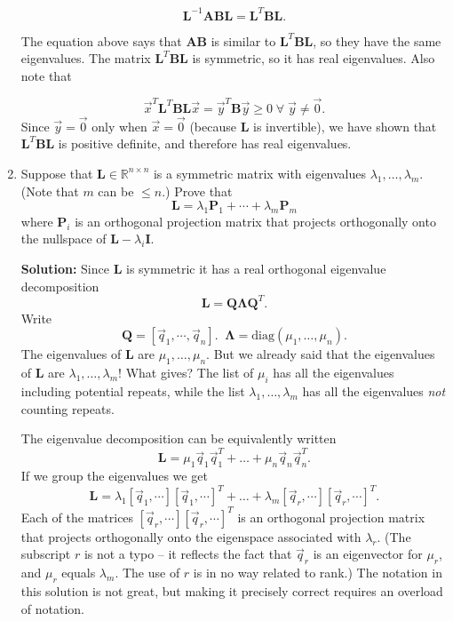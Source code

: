 \documentclass[11pt,fleqn]{article}
\begin{document}
\begin{enumerate}
\[\mathbf{L}^{-1}\mathbf{ABL} = \mathbf{L}^T\mathbf{B}\mathbf{L}.\]

The equation above says that $\mathbf{AB}$ is similar to $\mathbf{L}^T\mathbf{B}\mathbf{L}$, so they have the same eigenvalues.
The matrix $\mathbf{L}^T\mathbf{B}\mathbf{L}$ is symmetric, so it has real eigenvalues. Also note that

\[\vec{x}^T\mathbf{L}^T\mathbf{B}\mathbf{L}\vec{x} = \vec{y}^T\mathbf{B}\vec{y}\ge0\;\forall\;\vec{y}\neq \vec{0}.\]
Since $\vec{y}=\vec{0}$ only when $\vec{x}=\vec{0}$ (because $\mathbf{L}$ is invertible), we have shown that $\mathbf{L}^T\mathbf{B}\mathbf{L}$ is positive definite, and therefore has real eigenvalues.

\item Suppose that $\mathbf{L}\in\mathbb{R}^{n\times n}$ is a symmetric matrix with eigenvalues $\lambda_1,\ldots,\lambda_m$. (Note that $m$ can be $\le n$.) Prove that
\[\mathbf{L} = \lambda_1 \mathbf{P}_1 + \cdots+\lambda_m\mathbf{P}_m\]
where $\mathbf{P}_i$ is an orthogonal projection matrix that projects orthogonally onto the nullspace of $\mathbf{L} - \lambda_i\mathbf{I}$.

{\bf Solution:} Since {\bf L} is symmetric it has a real orthogonal eigenvalue decomposition
\[\mathbf{L} = \mathbf{Q\Lambda Q}^T.\]
Write
\[\mathbf{Q} = [\vec{q}_1,\cdots,\vec{q}_n].\;\;\mathbf{\Lambda} = \text{diag}(\mu_1,\ldots,\mu_n).\]
The eigenvalues of $\mathbf{L}$ are $\mu_1,\ldots,\mu_n$. But we already said that the eigenvalues of $\mathbf{L}$ are $\lambda_1,\ldots,\lambda_m$! What gives?
The list of $\mu_i$ has all the eigenvalues including potential repeats, while the list $\lambda_1,\ldots,\lambda_m$ has all the eigenvalues {\it not} counting repeats.

The eigenvalue decomposition can be equivalently written
\[\mathbf{L} = \mu_1\vec{q}_1\vec{q}_1^T + \ldots + \mu_n\vec{q}_n\vec{q}_n^T.\]
If we group the eigenvalues we get
\[\mathbf{L} = \lambda_1 [\vec{q}_1,\cdots][\vec{q}_1,\cdots]^T+\ldots + \lambda_m[\vec{q}_r,\cdots][\vec{q}_r,\cdots]^T.\]
Each of the matrices $[\vec{q}_r,\cdots][\vec{q}_r,\cdots]^T$ is an orthogonal projection matrix that projects orthogonally onto the eigenspace associated with $\lambda_r$.
(The subscript $r$ is not a typo -- it reflects the fact that $\vec{q}_r$ is an eigenvector for $\mu_r$, and $\mu_r$ equals $\lambda_m$. The use of $r$ is in no way related to rank.)
The notation in this solution is not great, but making it precisely correct requires an overload of notation.


\end{enumerate}
\end{document}

